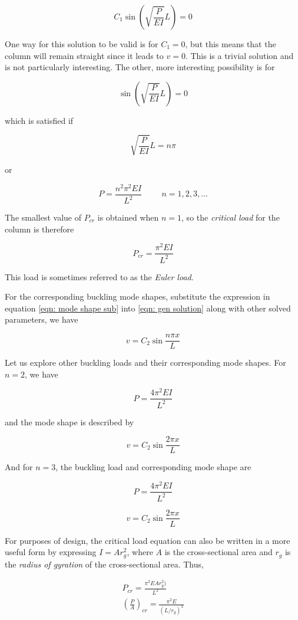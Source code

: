 \documentclass[a4paper,openany,nobib]{tufte-book}
\begin{document}
{{$$C_1\sin \left( \sqrt {\frac{P}{EI}} L \right) = 0$$

One way for this solution to be valid is for \(C_1 = 0\), but this means
that the column will remain straight since it leads to \(v = 0\). This is
a trivial solution and is not particularly interesting. The other, more
interesting possibility is for

$$\sin \left( \sqrt {\frac{P}{EI}} L \right) = 0$$

which is satisfied if

$$ \sqrt {\frac{P}{EI}} L = n\pi$$

or

$$P = \frac{n^2\pi^2EI}{L^2} \hspace{1cm}n = 1,2,3,...$$

The smallest value of \(P_{cr}\) is obtained when \(n = 1\), so the
\emph{critical load} for the column is therefore

$$P_{cr} = \frac{\pi ^2EI}{L^2}$$

This load is sometimes referred to as the \emph{Euler load}.

For the corresponding buckling mode shapes, substitute the expression in
equation \ref{eqn: mode shape sub} into \ref{eqn: gen solution} along with other solved
parameters, we have

$$v = C_2\sin \frac{n\pi x}{L}$$

Let us explore other buckling loads and their corresponding mode shapes.
For \(n = 2\), we have

$$P = \frac{4 \pi^2 E I}{L^2}$$

and the mode shape is described by

$$v = C_2 \sin \frac{2 \pi x}{L}$$


And for \(n=3\), the buckling load and corresponding mode shape are

$$P = \frac{4 \pi^2 E I}{L^2}$$

$$v = C_2 \sin \frac{2 \pi x}{L}$$


For purposes of design, the critical load equation can also be written
in a more useful form by expressing \(I = Ar_g^2\), where \(A\) is the
cross-sectional area and \(r_g\) is the \emph{radius of gyration} of the
cross-sectional area. Thus,

$$\begin{gathered}
  P_{cr} = \frac{\pi^2EAr_g^2)}{L^2} \\ 
  \left( \frac{P}{A} \right)_{cr} = \frac{\pi ^2E}{(L/r_g)^2}\end{gathered}$$

}}
\end{document}
